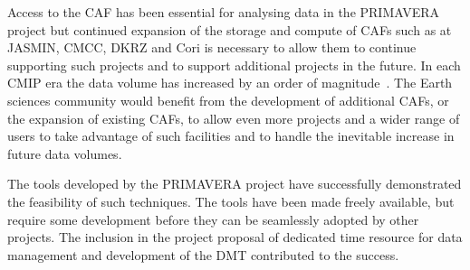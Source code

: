 \documentclass[gmd, manuscript]{copernicus}
\begin{document}
Access to the CAF has been essential for analysing data in the PRIMAVERA project but continued expansion of the storage and compute of CAFs such as at JASMIN, CMCC, DKRZ and Cori is necessary to allow them to continue supporting such projects and to support additional projects in the future. In each CMIP era the data volume has increased by an order of magnitude~\citep{gmd-11-3659-2018}. The Earth sciences community would benefit from the development of additional CAFs, or the expansion of existing CAFs, to allow even more projects and a wider range of users to take advantage of such facilities and to handle the inevitable increase in future data volumes.

The tools developed by the PRIMAVERA project have successfully demonstrated the feasibility of such techniques. The tools have been made freely available, but require some development before they can be seamlessly adopted by other projects. The inclusion in the project proposal of dedicated time resource for data management and development of the DMT contributed to the success.









\end{document}

